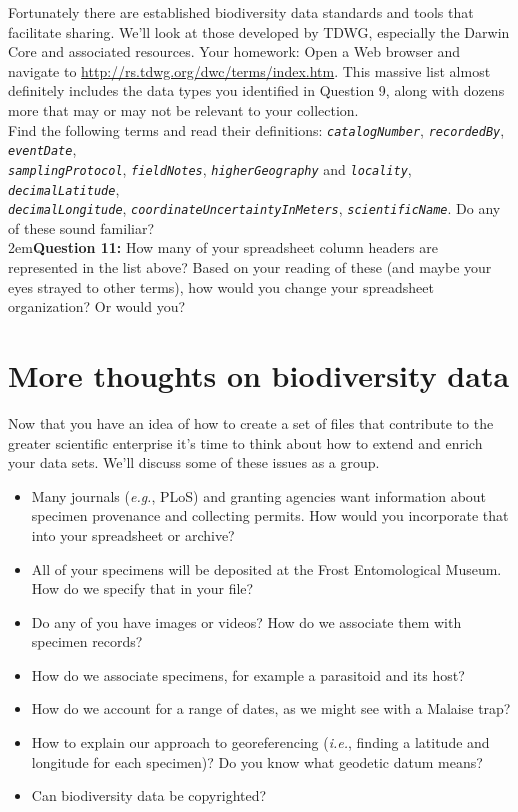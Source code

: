 \documentclass[letterpaper, 11pt]{article}
\newcommand{\latinword}[1]{\texttt{\itshape #1}}%
\begin{document}
\noindent{}Fortunately there are established biodiversity data standards and tools that facilitate sharing. We'll look at those developed by TDWG, especially the Darwin Core and associated resources. Your homework: Open a Web browser and navigate to \url{http://rs.tdwg.org/dwc/terms/index.htm}. This massive list almost definitely includes the data types you identified in Question 9, along with dozens more that may or may not be relevant to your collection.\\

\noindent{}Find the following terms and read their definitions: \latinword{catalogNumber}, \latinword{recordedBy}, \latinword{eventDate},\\ \latinword{samplingProtocol}, \latinword{fieldNotes}, \latinword{higherGeography} and \latinword{locality}, \latinword{decimalLatitude},\\ \latinword{decimalLongitude}, \latinword{coordinateUncertaintyInMeters}, \latinword{scientificName}. Do any of these sound familiar?\\

\hangindent2em\textbf{Question 11:} How many of your spreadsheet column headers are represented in the list above? Based on your reading of these (and maybe your eyes strayed to other terms), how would you change your spreadsheet organization? Or would you?

\section*{More thoughts on biodiversity data}
Now that you have an idea of how to create a set of files that contribute to the greater scientific enterprise it's time to think about how to extend and enrich your data sets. We'll discuss some of these issues as a group.
\begin{itemize}
\item Many journals (\textit{e.g.}, PLoS) and granting agencies want information about specimen provenance and collecting permits. How would you incorporate that into your spreadsheet or archive?
\item All of your specimens will be deposited at the Frost Entomological Museum. How do we specify that in your file?
\item Do any of you have images or videos? How do we associate them with specimen records?
\item How do we associate specimens, for example a parasitoid and its host? 
\item How do we account for a range of dates, as we might see with a Malaise trap?
\item How to explain our approach to georeferencing (\textit{i.e.}, finding a latitude and longitude for each specimen)? Do you know what geodetic datum means?
\item Can biodiversity data be copyrighted?
\end{itemize}
\end{document}
